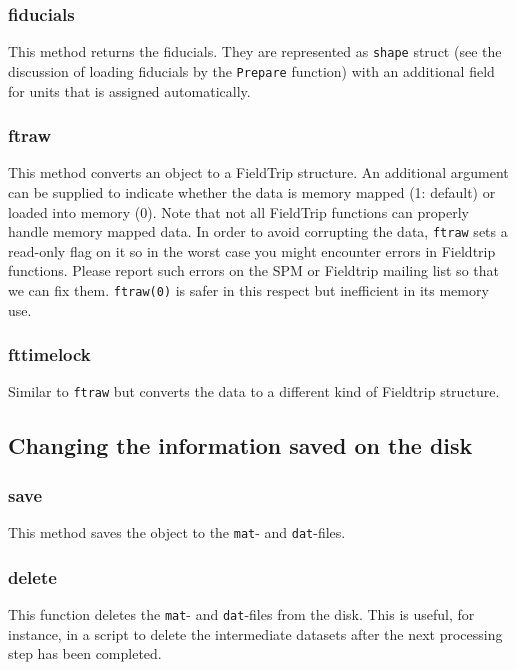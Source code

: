 \subsubsection{fiducials}
This method returns the fiducials. They are represented as \texttt{shape} struct (see the discussion of loading fiducials by the \texttt{Prepare} function) with an additional field for units that is assigned automatically.

\subsubsection{ftraw}
This method converts an object to a FieldTrip structure. An additional argument can be supplied to indicate whether the data is memory mapped (1: default) or loaded into memory (0). Note that not all FieldTrip functions can properly handle memory mapped data. In order to avoid corrupting the data, \texttt{ftraw} sets a read-only flag on it so in the worst case you might encounter errors in Fieldtrip functions. Please report such errors on the SPM or Fieldtrip mailing list so that we can fix them. \texttt{ftraw(0)} is safer in this respect but inefficient in its memory use.

\subsubsection{fttimelock}
Similar to \texttt{ftraw} but converts the data to a different kind of Fieldtrip structure. 

\subsection{Changing the information saved on the disk}

\subsubsection{save}
This method saves the object to the \texttt{mat}- and \texttt{dat}-files.

\subsubsection{delete}
This function deletes the \texttt{mat}- and \texttt{dat}-files from the disk. This is useful, for instance, in a script to delete the intermediate datasets after the next processing step has been completed. 

